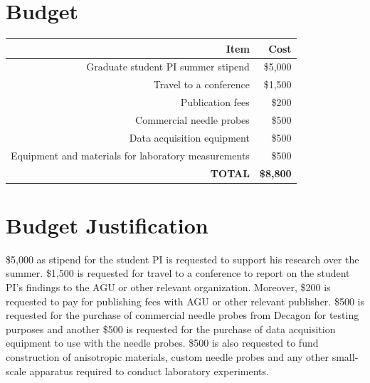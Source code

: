 \documentclass[12pt, letterpaper]{article}
\begin{document}
\section*{Budget}
\begin{center}
\begin{tabular}{r | r}
Item & Cost\\
\hline
Graduate student PI summer stipend & \$5,000\\
Travel to a conference & \$1,500\\
Publication fees & \$200\\
Commercial needle probes & \$500\\
Data acquisition equipment & \$500\\
Equipment and materials for laboratory measurements & \$500\\
\textbf{TOTAL} & \textbf{\$8,800}
\end{tabular}
\end{center}

\section*{Budget Justification}
\$5,000 as stipend for the student PI is requested to support his research over the summer. \$1,500 is requested for travel to a conference to report on the student PI's findings to the AGU or other relevant organization.  Moreover, \$200 is requested to pay for publishing fees with AGU or other relevant publisher. \$500 is requested for the purchase of commercial needle probes from Decagon for testing purposes and another \$500 is requested for the purchase of data acquisition equipment to use with the needle probes. \$500 is also requested to fund construction of anisotropic materials, custom needle probes and any other small-scale apparatus required to conduct laboratory experiments.
\end{document}
